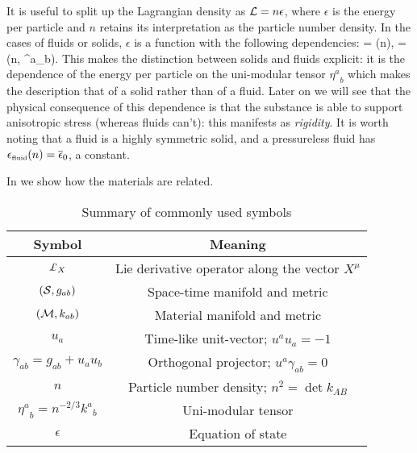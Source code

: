 It is useful to split up the Lagrangian density   as $\mathcal{L} = n \epsilon$, where $\epsilon$ is the energy per particle and $n$ retains its interpretation as the particle number density. In the  cases of   fluids or solids, $\epsilon$ is a function with the following dependencies:
\bea
{} = (n),\qquad {} = (n, {\eta^a}_b).
\eea
This makes the distinction between solids and fluids explicit: it is the dependence of the energy per particle on the uni-modular tensor ${\eta^a}_b$ which makes the description that of a solid rather than of a fluid. Later on we will see that the physical consequence of this dependence is that the substance is able to support anisotropic stress (whereas fluids can't): this manifests as \textit{rigidity}. It is worth noting that a fluid is a highly symmetric solid, and a pressureless fluid has ${\epsilon}_{\scriptscriptstyle{\textrm{fluid}}}(n) = \overline{\epsilon}_0$, a constant.

In  we show how the materials are related.



{\renewcommand{\arraystretch}{1.4}
\begin{table}%
\begin{center}
\begin{tabular}{||c |  c ||}
\hline
\textbf{Symbol} & \textbf{Meaning} \\
\hline
$\lied{X}$ & Lie derivative operator along the vector $X^{\mu}$\\\hline
$\left(\mathcal{S}, g_{ab}\right)$ & Space-time manifold and metric\\\hline
$\left(\mathcal{M}, k_{ab}\right)$ & Material manifold and metric \\\hline
$u_a$ & Time-like unit-vector; $u^au_a = -1$\\\hline
$\gamma_{ab} = g_{ab} + u_au_b$ & Orthogonal projector; $u^a\gamma_{ab}=0$\\\hline
$n$ & Particle number density; $n^2 = \det k_{AB} $\\\hline
${\eta^a}_b = n^{-2/3}{k^a}_b$ & Uni-modular tensor\\\hline
$\epsilon$ & Equation of state
\\\hline
\end{tabular}\caption{Summary of commonly used symbols}\label{tab:common}
\end{center}
\end{table}
}

